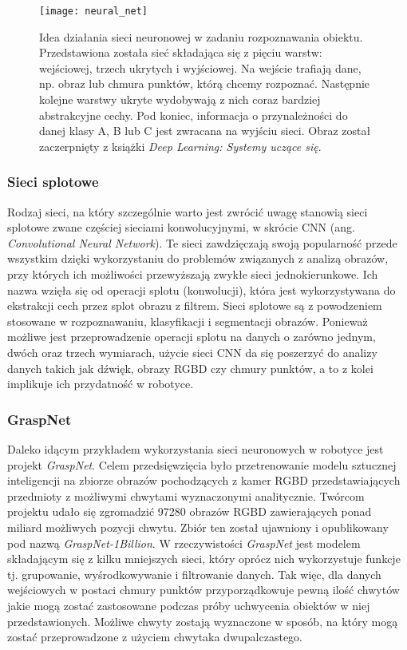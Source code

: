 \documentclass{article}
\begin{document}
\begin{figure}[h!]
\centering
\texttt{[image: neural\_net]}
\caption{Idea działania sieci neuronowej w zadaniu rozpoznawania obiektu. Przedstawiona została sieć składająca się z pięciu warstw: wejściowej, trzech ukrytych i wyjściowej. Na wejście trafiają dane, np. obraz lub chmura punktów, którą chcemy rozpoznać. Następnie kolejne warstwy ukryte wydobywają z nich coraz bardziej abstrakcyjne cechy. Pod koniec, informacja o przynależności do danej klasy A, B lub C jest zwracana na wyjściu sieci. Obraz został zaczerpnięty z książki \emph{Deep Learning: Systemy uczące się}.}
\end{figure}

\subsubsection*{\Large{Sieci splotowe}}
Rodzaj sieci, na który szczególnie warto jest zwrócić uwagę stanowią sieci splotowe zwane częściej sieciami konwolucyjnymi, w skrócie CNN (ang. \emph{Convolutional Neural Network}). Te sieci zawdzięczają swoją popularność przede wszystkim dzięki wykorzystaniu do problemów związanych z analizą obrazów, przy których ich możliwości przewyższają zwykłe sieci jednokierunkowe. Ich nazwa wzięła się od operacji splotu (konwolucji), która jest wykorzystywana do ekstrakcji cech przez splot obrazu z filtrem. Sieci splotowe są z powodzeniem stosowane w rozpoznawaniu, klasyfikacji i segmentacji obrazów. Ponieważ możliwe jest przeprowadzenie operacji splotu na danych o zarówno jednym, dwóch oraz trzech wymiarach, użycie sieci CNN da się poszerzyć do analizy danych takich jak dźwięk, obrazy RGBD czy chmury punktów, a to z kolei implikuje ich przydatność w robotyce.

\subsubsection*{\Large{GraspNet}}
Daleko idącym przykładem wykorzystania sieci neuronowych w robotyce jest projekt \emph{GraspNet}. Celem przedsięwzięcia było przetrenowanie modelu sztucznej inteligencji na zbiorze obrazów pochodzących z kamer RGBD przedstawiających przedmioty z możliwymi chwytami wyznaczonymi analitycznie. Twórcom projektu udało się zgromadzić 97280 obrazów RGBD zawierających ponad miliard możliwych pozycji chwytu. Zbiór ten został ujawniony i opublikowany pod nazwą \emph{GraspNet-1Billion}. W rzeczywistości \emph{GraspNet} jest modelem składającym się z kilku mniejszych sieci, który oprócz nich wykorzystuje funkcje tj. grupowanie, wyśrodkowywanie i filtrowanie danych. Tak więc, dla danych wejściowych w postaci chmury punktów przyporządkowuje pewną ilość chwytów jakie mogą zostać zastosowane podczas próby uchwycenia obiektów w niej przedstawionych. Możliwe chwyty zostają wyznaczone w sposób, na który mogą zostać przeprowadzone z użyciem chwytaka dwupalczastego.
\end{document}
